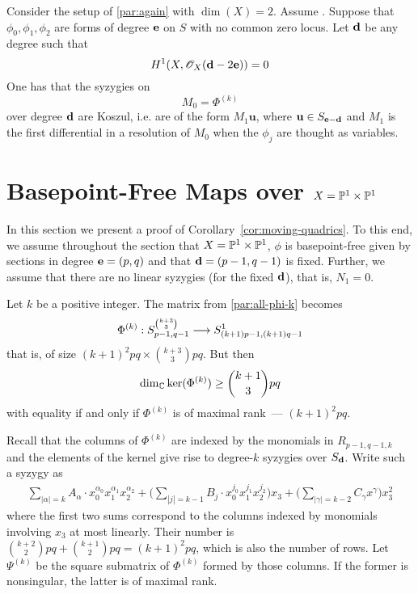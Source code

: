\documentclass[fleqn,reqno]{amsart}
\begin{document}
\begin{proposition}
\label{prop:koszul-syzygies}
Consider the setup of \eqref{par:again} with $\dim(X)=2$.
Assume .
Suppose that $\phi_0,\phi_1,\phi_2$ are forms of degree $\mathbf e$ on $S$ with no common zero locus.
Let $\mathbf d$ be any degree such that
\[
	H^1(X,\mathscr{O}_X(\mathbf d-2\mathbf e))=0
\]
One has that the syzygies on
\[
	M_0=\Phi^{(k)}
\]
over degree $\mathbf d$ are Koszul, i.e. are of the form $M_1{\mathbf u}$,
where $\mathbf u\in S_{\mathbf e-\mathbf d}$
and $M_1$ is the first differential in a resolution of $M_0$
when the $\phi_j$ are thought as variables.
\end{proposition}



\section{Basepoint-Free Maps over $X=\mathbb{P}^1\times\mathbb{P}^1$}
\label{sec:bpf-maps-ppp}

\begin{paragraf*}
In this section we present a proof of Corollary~\ref{cor:moving-quadrics}.
To this end, we assume throughout the section that $X=\mathbb{P}^1\times\mathbb{P}^1$,
$\phi$ is basepoint-free given by sections in degree $\mathbf e=(p,q)$
and that $\mathbf d=(p-1,q-1)$ is fixed.
Further, we assume that there are no linear syzygies (for the fixed $\mathbf d$),
that is, $N_1=0$.
\end{paragraf*}

\begin{paragraph}
\label{par:count-rels}
Let $k$ be a positive integer.
The matrix from \eqref{par:all-phi-k} becomes
\[
	\Phi^{(k)}:S_{p-1,q-1}^{\binom{k+3}{3}}\longrightarrow S_{(k+1)p-1,(k+1)q-1}^1
\]
that is, of size $(k+1)^2pq\times\binom{k+3}{3}pq$.
But then
\begin{align}
	\dim_{\mathbb{C}}\ker(\Phi^{(k)})\geq\binom{k+1}{3}pq\label{eqn1}
\end{align}
with equality if and only if $\Phi^{(k)}$ is of maximal rank~--- $(k+1)^2pq$.
\end{paragraph}

\begin{paragraph}
Recall that the columns of $\Phi^{(k)}$ are indexed
by the monomials in $R_{p-1,q-1,k}$
and the elements of the kernel give rise to degree-$k$ syzygies over $S_\mathbf d$.
Write such a syzygy as
\begin{align}\label{ebasi}
	\sum_{|\alpha|=k} A_\alpha\cdot
	x_0^{\alpha_0}x_1^{\alpha_1}x_2^{\alpha_2}+
	\big(\sum_{|j|=k-1} B_{j}\cdot
	x_0^{j_0}x_1^{j_1}x_2^{j_2}\big)x_3+
	\big(\sum_{|\gamma|=k-2}C_\gamma x^\gamma\big)x_3^2
\end{align}
where the first two sums correspond to
the columns indexed by monomials involving $x_3$ at most linearly.
Their number is $\binom{k+2}{2}pq+\binom{k+1}{2}pq=(k+1)^2pq$,
which is also the number of rows.
Let $\Psi^{(k)}$ be the square submatrix of $\Phi^{(k)}$ formed by those columns.
If the former is nonsingular, the latter is of maximal rank.
\end{paragraph}
\end{document}
